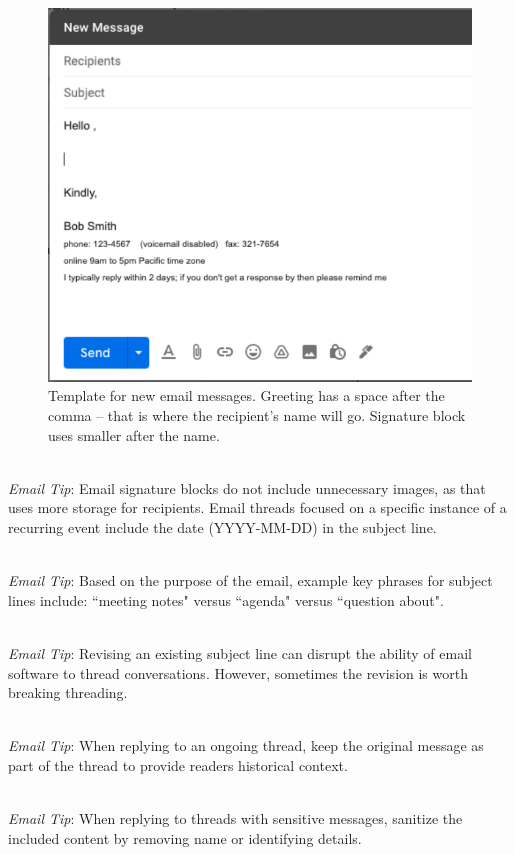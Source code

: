 \begin{figure}
\includegraphics[width=1\textwidth]{images/email_template.pdf}
\caption{Template for new email messages. Greeting has a space after the comma -- that is where the recipient's name will go. Signature block uses smaller after the name.}
\label{fig:email_template}
\end{figure}

\ \\
\textit{Email Tip}: Email signature blocks do not include unnecessary images, as that uses more storage for recipients. 
Email threads focused on a specific instance of a recurring event include the date (YYYY-MM-DD) in the subject line. 

\ \\
\textit{Email Tip}: Based on the purpose of the email, example key phrases for subject lines include: ``meeting notes" versus ``agenda" versus ``question about".

\ \\
\textit{Email Tip}: Revising an existing subject line can disrupt the ability of email software to thread conversations. However, sometimes the revision is worth breaking threading.

\ \\
\textit{Email Tip}: When replying to an ongoing thread, keep the original message as part of the thread to provide readers historical context.

\ \\
\textit{Email Tip}: When replying to threads with sensitive messages, sanitize the included content by removing name or identifying details.

